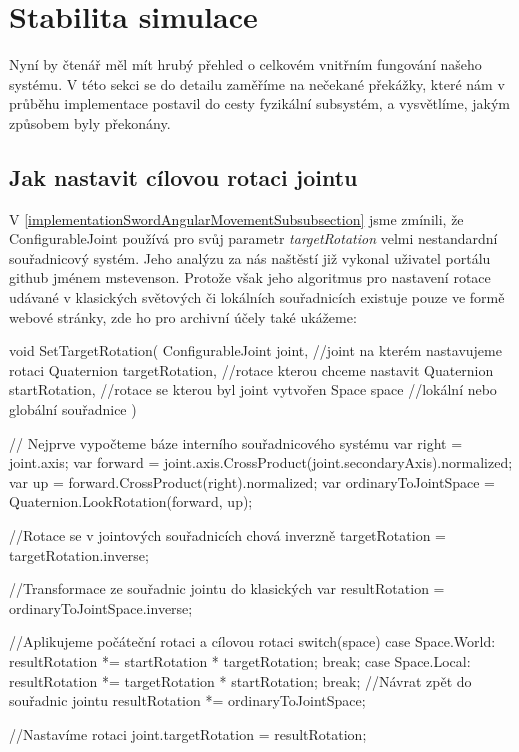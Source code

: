 \section{Stabilita simulace} \label{simulationStabilitySection}

Nyní by čtenář měl mít hrubý přehled o celkovém vnitřním fungování našeho systému. V této sekci se do detailu zaměříme na nečekané překážky, které nám v průběhu implementace postavil do cesty fyzikální subsystém, a vysvětlíme, jakým způsobem byly překonány.


\subsection{Jak nastavit cílovou rotaci jointu} \label{howToSetJointsTargetRotationSection}

V \ref{implementationSwordAngularMovementSubsubsection} jsme zmínili, že ConfigurableJoint používá pro svůj parametr \textit{targetRotation} velmi nestandardní souřadnicový systém. Jeho analýzu za nás naštěstí již vykonal \cite{ConfigurableJointExtensions} uživatel portálu github jménem mstevenson. Protože však jeho algoritmus pro nastavení rotace udávané v klasických světových či lokálních souřadnicích existuje pouze ve formě webové stránky, zde ho pro archivní účely také ukážeme: 

\begin{code}
void SetTargetRotation(
 ConfigurableJoint joint, //joint na kterém nastavujeme rotaci 
 Quaternion targetRotation, //rotace kterou chceme nastavit
 Quaternion startRotation, //rotace se kterou byl joint vytvořen
 Space space //lokální nebo globální souřadnice
)
{
 // Nejprve vypočteme báze interního souřadnicového systému
 var right = joint.axis;
 var forward = joint.axis.CrossProduct(joint.secondaryAxis).normalized;
 var up = forward.CrossProduct(right).normalized;
 var ordinaryToJointSpace = Quaternion.LookRotation(forward, up);
 
 //Rotace se v jointových souřadnicích chová inverzně
 targetRotation = targetRotation.inverse;

 //Transformace ze souřadnic jointu do klasických
 var resultRotation = ordinaryToJointSpace.inverse;

 //Aplikujeme počáteční rotaci a cílovou rotaci
 switch(space){
  case Space.World:
    resultRotation *= startRotation * targetRotation;
    break;
  case Space.Local:
    resultRotation *= targetRotation * startRotation;
    break;
 }
 //Návrat zpět do souřadnic jointu
 resultRotation *= ordinaryToJointSpace;
 
 //Nastavíme rotaci
 joint.targetRotation = resultRotation;
 }
\end{code}

